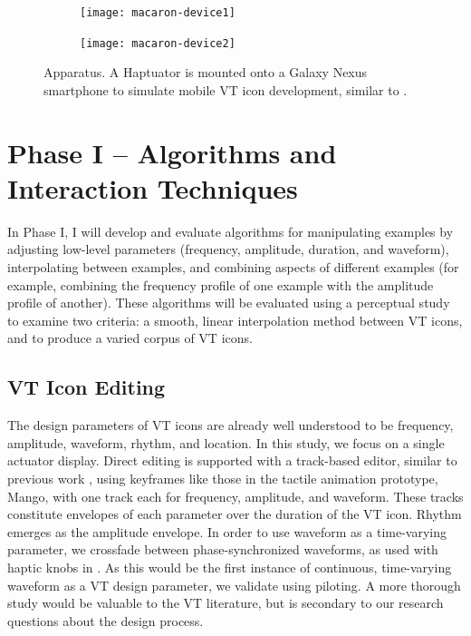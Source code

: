 %



\begin{figure}[htbp]
 \centering
   \begin{subfigure}[t]{0.35\textwidth}
	  \centering
	   \texttt{[image: macaron-device1]} 
	   \label{fig:macarondevice:front}
    \end{subfigure}
    \qquad
     \begin{subfigure}[t]{0.35\textwidth}
	  \centering
	   \texttt{[image: macaron-device2]} 
	   \label{fig:macarondevice:back}
    \end{subfigure}

    \caption{Apparatus. A Haptuator is mounted onto a Galaxy Nexus smartphone to simulate mobile VT icon development, similar to \cite{InwookHwang2013}.}
    \label{fig:macarondevice}
\end{figure}


\section{Phase I -- Algorithms and Interaction Techniques}
In Phase I, I will develop and evaluate algorithms for manipulating examples by adjusting low-level parameters (frequency, amplitude, duration, and waveform), interpolating between examples, and combining aspects of different examples (for example, combining the frequency profile of one example with the amplitude profile of another). These algorithms will be evaluated using a perceptual study to examine two criteria: a smooth, linear interpolation method between VT icons, and to produce a varied corpus of VT icons.

\subsection{VT Icon Editing}
The design parameters of VT icons are already well understood to be frequency, amplitude, waveform, rhythm, and location.
In this study, we focus on a single actuator display.
Direct editing is supported with a track-based editor, similar to previous work \cite{Swindells2006}, using keyframes like those in the tactile animation prototype, Mango, with one track each for frequency, amplitude, and waveform.
These tracks constitute envelopes of each parameter over the duration of the VT icon.
Rhythm emerges as the amplitude envelope.
In order to use waveform as a time-varying parameter, we crossfade between phase-synchronized waveforms, as used with haptic knobs in \cite{MacLean2009a}.
As this would be the first instance of continuous, time-varying waveform as a VT design parameter, we validate using piloting.
A more thorough study would be valuable to the VT literature, but is secondary to our research questions about the design process.

